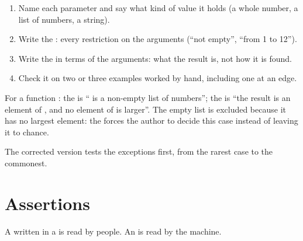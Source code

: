 \begin{method}\label{met:g10:specifications-and-tests:write-spec}
\begin{enumerate}
  \item Name each parameter and say what kind of value it holds (a whole number, a list of numbers, a string).
  \item Write the : every restriction on the arguments (``not empty'', ``from 1 to 12'').
  \item Write the  in terms of the arguments: what the result is, not how it is found.
  \item Check it on two or three examples worked by hand, including one at an edge.
\end{enumerate}
\end{method}

\begin{example}\label{ex:g10:specifications-and-tests:max-spec}
For a function : the  is `` is a non-empty list of numbers''; the
 is ``the result is an element of , and no element of  is larger''. The empty list
is excluded because it has no largest element: the  forces the author to decide this case instead of
leaving it to chance.
\end{example}

The corrected version tests the exceptions first, from the rarest case to the commonest.

\label{lst:g10:specifications-and-tests:leap-fixed}

\section{Assertions}\label{sec:g10:specifications-and-tests:assertions}

A  written in a  is read by people. An  is read by the machine.

